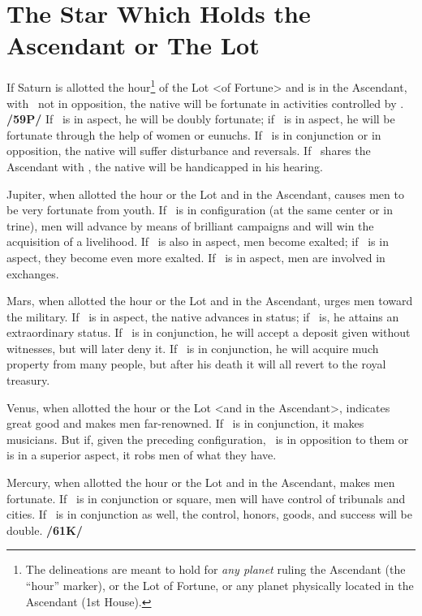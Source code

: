 \section{The Star Which Holds the Ascendant or The Lot}
If  Saturn is allotted the hour\footnote{The delineations are meant to hold for \textit{any planet} ruling the Ascendant (the ``hour'' marker), or the Lot of Fortune, or any planet physically located in the Ascendant (1st House).} of the Lot <of Fortune> and is in the Ascendant, with \Mars\, not in opposition, the native will be fortunate in activities controlled by \Saturn. \textbf{/59P/} If \Jupiter\, is in aspect, he will be doubly fortunate; if \Venus\, is in aspect, he will be fortunate through the help of women or eunuchs. If \Mars\, is in conjunction or in opposition, the native will suffer disturbance and reversals. If \Mercury\,
shares the Ascendant with \Saturn, the native will be handicapped in his hearing.

Jupiter, when allotted the hour or the Lot and in the Ascendant, causes men to be very fortunate from youth. If \Mars\, is in configuration (at the same center or in trine), men will advance by means of brilliant campaigns and will win the acquisition of a livelihood. If \Saturn\, is also in aspect, men become exalted; if \Venus\, is in aspect, they become even more exalted. If \Mercury\, is in aspect, men are involved in exchanges.

 Mars, when allotted the hour or the Lot and in the Ascendant, urges men toward the military. If \Jupiter\, is in aspect, the native advances in status; if \Venus\, is, he attains an extraordinary status. If \Mercury\, is in conjunction, he will accept a deposit given without witnesses, but will later deny it. If \Jupiter\, is in conjunction, he will acquire much property from many people, but after his death it will all revert to the royal treasury.

 Venus, when allotted the hour or the Lot <and in the Ascendant>, indicates great good and makes men far-renowned. If \Mercury\, is in conjunction, it makes musicians. But if, given the preceding configuration, \Saturn\, is in opposition to them or is in a superior aspect, it robs men of what they have.

 Mercury, when allotted the hour or the Lot and in the Ascendant, makes men fortunate. If \Jupiter\, is in
conjunction or square, men will have control of tribunals and cities. If \Saturn\, is in conjunction as well, the
control, honors, goods, and success will be double. \textbf{/61K/}

